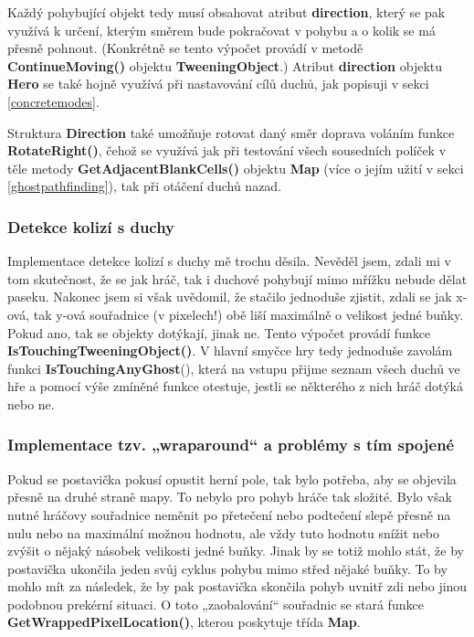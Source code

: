 \documentclass[a4]{article}
\begin{document}
Každý pohybující objekt tedy musí obsahovat atribut \textbf{direction}, který se pak využívá k určení, kterým směrem bude pokračovat v pohybu a o kolik se má přesně pohnout. (Konkrétně se tento výpočet provádí v metodě \textbf{ContinueMoving()} objektu \textbf{TweeningObject}.) Atribut \textbf{direction} objektu \textbf{Hero} se také hojně využívá při nastavování cílů duchů, jak popisuji v sekci \ref{concretemodes}.

Struktura \textbf{Direction} také umožňuje rotovat daný směr doprava voláním funkce \textbf{RotateRight()}, čehož se využívá jak při testování všech sousedních políček v těle metody \textbf{GetAdjacentBlankCells()} objektu \textbf{Map} (více o jejím užití v sekci \ref{ghostpathfinding}), tak při otáčení duchů nazad.

\subsubsection{Detekce kolizí s duchy} \label{collisiondetection}
Implementace detekce kolizí s duchy mě trochu děsila. Nevěděl jsem, zdali mi v tom skutečnost, že se jak hráč, tak i duchové pohybují mimo mřížku nebude dělat paseku. Nakonec jsem si však uvědomil, že stačilo jednoduše zjistit, zdali se jak x-ová, tak y-ová souřadnice (v pixelech!) obě liší maximálně o velikost jedné buňky. Pokud ano, tak se objekty dotýkají, jinak ne. Tento výpočet provádí funkce \textbf{IsTouchingTweeningObject()}. V hlavní smyčce hry tedy jednoduše zavolám funkci \textbf{IsTouchingAnyGhost}(), která na vstupu přijme seznam všech duchů ve hře a pomocí výše zmíněné funkce otestuje, jestli se některého z nich hráč dotýká nebo ne.

\subsubsection{Implementace tzv. „wraparound“ a problémy s tím spojené} \label{wraparound}
Pokud se postavička pokusí opustit herní pole, tak bylo potřeba, aby se objevila přesně na druhé straně mapy. To nebylo pro pohyb hráče tak složité. Bylo však nutné hráčovy souřadnice neměnit po přetečení nebo podtečení slepě přesně na nulu nebo na maximální možnou hodnotu, ale vždy tuto hodnotu snížit nebo zvýšit o nějaký násobek velikosti jedné buňky. Jinak by se totiž mohlo stát, že by postavička ukončila jeden svůj cyklus pohybu mimo střed nějaké buňky. To by mohlo mít za následek, že by pak postavička skončila pohyb uvnitř zdi nebo jinou podobnou prekérní situaci. O toto „zaobalování“ souřadnic se stará funkce \textbf{GetWrappedPixelLocation()}, kterou poskytuje třída \textbf{Map}.
\end{document}
